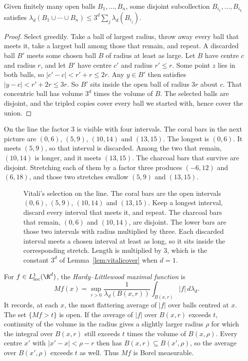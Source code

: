 \begin{lemma}\label{lem:vitalicover}
Given finitely many open balls $B_1,\dots,B_n$, some disjoint subcollection $B_{i_1},\dots,B_{i_k}$ satisfies $\lambda_d(B_1\cup\cdots\cup B_n)\le3^d\sum_j\lambda_d(B_{i_j})$.
\end{lemma}
\begin{proof}
Select greedily. Take a ball of largest radius, throw away every ball that meets it, take a largest ball among those that remain, and repeat. A discarded ball $B'$ meets some chosen ball $B$ of radius at least as large. Let $B$ have centre $c$ and radius $r$, and let $B'$ have centre $c'$ and radius $r'\le r$. Some point $z$ lies in both balls, so $|c'-c|<r'+r\le2r$. Any $y\in B'$ then satisfies $|y-c|<r'+2r\le3r$. So $B'$ sits inside the open ball of radius $3r$ about $c$. That concentric ball has volume $3^d$ times the volume of $B$. The selected balls are disjoint, and the tripled copies cover every ball we started with, hence cover the union.
\end{proof}

On the line the factor $3$ is visible with four intervals. The coral bars in the next picture are $(0,6)$, $(5,9)$, $(10,14)$ and $(13,15)$. The longest is $(0,6)$. It meets $(5,9)$, so that interval is discarded. Among the two that remain, $(10,14)$ is longer, and it meets $(13,15)$. The charcoal bars that survive are disjoint. Stretching each of them by a factor three produces $(-6,12)$ and $(6,18)$, and those two stretches swallow $(5,9)$ and $(13,15)$.

\begin{figure}[ht]
\centering
{}
\caption{Vitali's selection on the line. The coral bars are the open intervals $(0,6)$, $(5,9)$, $(10,14)$ and $(13,15)$. Keep a longest interval, discard every interval that meets it, and repeat. The charcoal bars that remain, $(0,6)$ and $(10,14)$, are disjoint. The lower bars are those two intervals with radius multiplied by three. Each discarded interval meets a chosen interval at least as long, so it sits inside the corresponding stretch. Length is multiplied by $3$, which is the constant $3^d$ of Lemma~\ref{lem:vitalicover} when $d=1$.}
\end{figure}

For $f\in L^1_{\mathrm{loc}}(\R^d)$, the \emph{Hardy--Littlewood maximal function} is
\[Mf(x)=\sup_{r>0}\frac1{\lambda_d(B(x,r))}\int_{B(x,r)}|f|\,d\lambda_d.\]
It records, at each $x$, the most flattering average of $|f|$ over balls centred at $x$. The set $\{Mf>t\}$ is open. If the average of $|f|$ over $B(x,r)$ exceeds $t$, continuity of the volume in the radius gives a slightly larger radius $\rho$ for which the integral over $B(x,r)$ still exceeds $t$ times the volume of $B(x,\rho)$. Every centre $x'$ with $|x'-x|<\rho-r$ then has $B(x,r)\subseteq B(x',\rho)$, so the average over $B(x',\rho)$ exceeds $t$ as well. Thus $Mf$ is Borel measurable.


